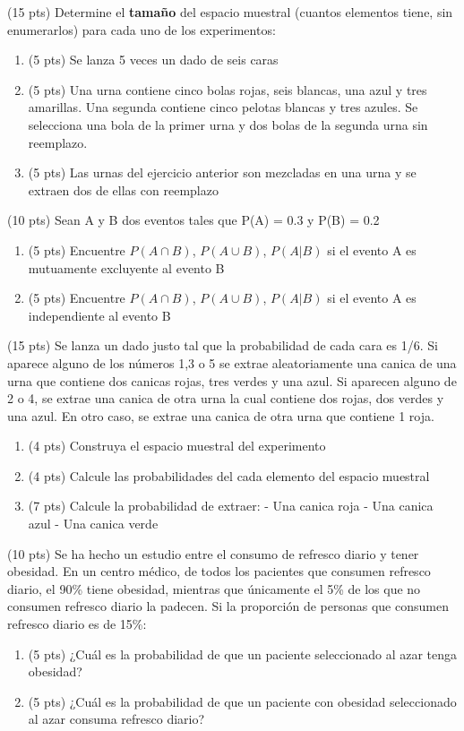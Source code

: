 \documentclass[addpoints]{exam}
\theoremstyle{mytheor}
\begin{document}
  \begin{questions} 
  
  \question (15 pts) 
  Determine el \textbf{tamaño} del espacio muestral (cuantos elementos tiene, sin enumerarlos) para cada uno de los experimentos:
  \begin{enumerate}
  \item (5 pts) Se lanza 5 veces un dado de seis caras
  \item (5 pts) Una urna contiene cinco bolas rojas, seis blancas, una azul y tres amarillas. Una segunda contiene cinco pelotas blancas y tres azules. Se selecciona una bola de la primer urna y dos bolas de la segunda urna sin reemplazo. 
  \item (5 pts) Las urnas del ejercicio anterior son mezcladas en una urna y se extraen dos de ellas con reemplazo
  \end{enumerate}
  

\question (10 pts)
Sean A y B dos eventos tales que P(A) = 0.3 y P(B) = 0.2
\begin{enumerate}[label=\Alph*)]
\item (5 pts) Encuentre $P(A \cap B)$, $P(A \cup B)$, $P(A | B)$ si el evento A es mutuamente excluyente al evento B
\item (5 pts) Encuentre $P(A \cap B)$, $P(A \cup B)$, $P(A | B)$ si el evento A es independiente al evento B
\end{enumerate}

  \question (15 pts)
Se lanza un dado justo tal que la probabilidad de cada cara es 1/6. Si aparece alguno de los números 1,3 o 5 se extrae aleatoriamente una canica de una urna que contiene dos canicas rojas, tres verdes y una azul. Si aparecen alguno de 2 o 4, se extrae una canica de otra urna la cual contiene dos rojas, dos verdes y una azul. En otro caso, se extrae una canica de otra urna que contiene 1 roja.

 \begin{enumerate}[label=\Alph*)]
\item (4 pts) Construya el espacio muestral del experimento 
\item (4 pts) Calcule las probabilidades del cada elemento del espacio muestral
\item (7 pts) Calcule la probabilidad de extraer:
\subitem - Una canica roja 
\subitem - Una canica azul
\subitem - Una canica verde
\end{enumerate}
 
\question (10 pts)
Se ha hecho un estudio entre el consumo de refresco diario y tener obesidad. En un centro médico, de todos los pacientes que consumen refresco diario, el 90\% tiene obesidad, mientras que únicamente el 5\% de los que no consumen refresco diario la padecen. Si la proporción de personas que consumen refresco diario es de 15\%:
\begin{enumerate}[label=\Alph*)]
\item (5 pts) ¿Cuál es la probabilidad de que un paciente seleccionado al azar tenga obesidad?
\item (5 pts) ¿Cuál es la probabilidad de que un paciente con obesidad seleccionado al azar consuma refresco diario? 
\end{enumerate}


\end{questions}
\end{document}
